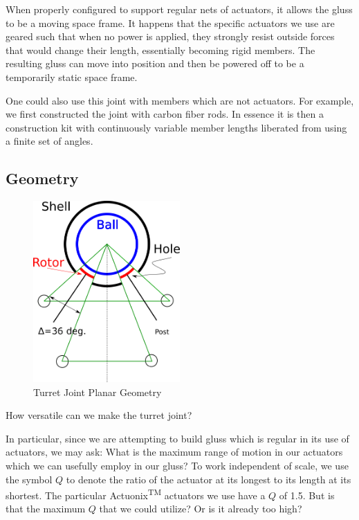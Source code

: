 \documentclass[11pt]{article}
\begin{document}
When properly configured to support regular nets of actuators,
it allows the gluss to be a moving space frame. It happens that the specific actuators we use
are geared such that when no power is applied, they strongly resist outside forces that would change their length,
essentially becoming rigid members.
The resulting gluss
can move into position and then be powered off to be a temporarily static space frame.

One could also use this joint with members which are not actuators. For example, we first
constructed the joint with carbon fiber rods. In essence it is then a construction kit with continuously
variable member lengths liberated from using a finite set of angles.

\subsection{Geometry}

\begin{figure}[H]
  \centering
  \includegraphics[width=0.5\textwidth]{figures/SimplifiedConstraintDrawing.png}
    \caption[Turret Joint Planar Geometry]{Turret Joint Planar Geometry}
      \label{simplified-constraint-drawing}
\end{figure}

How versatile can we make the turret joint?

In particular, since we are attempting to build gluss which is regular in its use of actuators, we may ask:
What is the maximum range of motion in our
actuators which we can usefully employ in our gluss?
To work independent of scale, we use the symbol $Q$ to denote the ratio of the actuator at its
longest to its length at its shortest.
The particular Actuonix\textsuperscript{TM} actuators we use have a $Q$ of 1.5. But is that the maximum $Q$ that we could utilize? Or is
it already too high?
\end{document}
